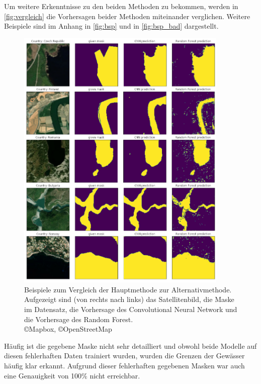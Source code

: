 Um weitere Erkenntnisse zu den beiden Methoden zu bekommen, werden in \autoref{fig:vergleich} die Vorhersagen beider Methoden miteinander verglichen.
Weitere Beispiele sind im Anhang in \autoref{fig:bsp} und in \autoref{fig:bsp_bad} dargestellt.

\begin{figure}
    \centering
    \includegraphics[width=0.9\textwidth]{images/vergleich.png}
    \caption{Beispiele zum Vergleich der Hauptmethode zur Alternativmethode. %
    Aufgezeigt sind (von rechts nach links) das Satellitenbild, die Maske im Datensatz, die Vorhersage des Convolutional Neural Network und die Vorhersage des Random Forest.%
    \\ \copyright Mapbox, \copyright OpenStreetMap}
    \label{fig:vergleich}
\end{figure}

Häufig ist die gegebene Maske nicht sehr detailliert 
und obwohl beide Modelle auf diesen fehlerhaften Daten trainiert wurden,
wurden die Grenzen der Gewässer häufig klar erkannt.
Aufgrund dieser fehlerhaften gegebenen Masken war auch eine Genauigkeit von 100\% nicht erreichbar.

